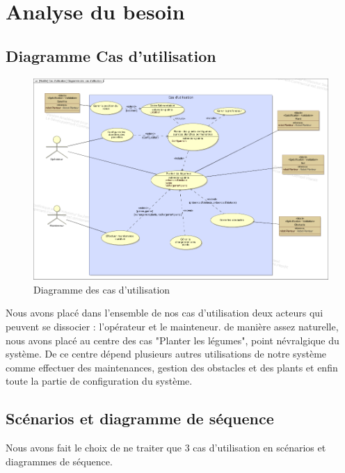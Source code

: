 \chapter{Analyse du besoin}

\section{Diagramme Cas d'utilisation}	%
\begin{figure}[!ht]
\centering
\includegraphics[width=.7\textwidth]{./I/images/casUtilisation.pdf}
\caption{Diagramme des cas d'utilisation}\label{fig:diagUC}
\end{figure} 
Nous avons placé dans l'ensemble de nos cas d'utilisation deux acteurs qui peuvent se dissocier : l'opérateur et le mainteneur. de manière assez naturelle, nous avons placé au centre des cas "Planter les légumes", point névralgique du système. De ce centre dépend plusieurs autres utilisations de notre système comme effectuer des maintenances, gestion des obstacles et des plants et enfin toute la partie de configuration du système.

\section{Scénarios et diagramme de séquence}
Nous avons fait le choix de ne traiter que 3 cas d'utilisation en scénarios et diagrammes de séquence.

